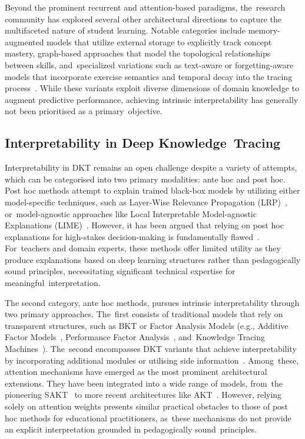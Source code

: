 \documentclass[applsci,article,accept,moreauthors,pdftex]{Definitions/mdpi}
\begin{document}
Beyond the prominent recurrent and attention-based paradigms, the~research community has explored several other architectural directions to capture the multifaceted nature of student learning. Notable categories include memory-augmented models that utilize external storage to explicitly track concept mastery, graph-based approaches that model the topological relationships between skills, and~specialized variations such as text-aware or forgetting-aware models that incorporate exercise semantics and temporal decay into the tracing process~\citep{abdelrahman2023knowledge}. While these variants exploit diverse dimensions of domain knowledge to augment predictive performance, achieving intrinsic interpretability has generally not been {prioritised} as a primary~objective.

\subsection{Interpretability in Deep Knowledge~Tracing} \label{sec_interpretability}

Interpretability in DKT remains an open challenge despite a variety of attempts, which can be categorised into two primary modalities: ante hoc and post hoc. Post hoc methods attempt to explain trained black-box models by utilizing either model-specific techniques, such as Layer-Wise Relevance Propagation (LRP)~\citep{bach2015pixel}, or~model-agnostic approaches like Local Interpretable Model-agnostic Explanations (LIME)~\citep{ribeiro2016should}. However, it has been argued that relying on post hoc explanations for high-stakes decision-making is fundamentally flawed~\citep{rudin2019stop}. For~teachers and domain experts, these methods offer limited utility as they produce explanations based on deep learning structures rather than pedagogically sound principles, necessitating significant technical expertise for meaningful~interpretation.

The second category, ante hoc methods, pursues intrinsic interpretability through two primary approaches. The~first consists of traditional models that rely on transparent structures, such as BKT or Factor Analysis Models (e.g., Additive Factor Models~\citep{cen2008comparing}, Performance Factor Analysis~\citep{pavlik2009performance}, and~Knowledge Tracing Machines~\citep{vie2019knowledge}). The~second encompasses DKT variants that achieve interpretability by incorporating additional modules or {utilising} side information~\citep{bai2024survey}. Among~these, attention mechanisms have emerged as the most prominent architectural extensions. They have been integrated into a wide range of models, from~the pioneering SAKT~\citep{Pandey2019384} to more recent architectures like AKT~\citep{ghosh2020context}. However, relying solely on attention weights presents similar practical obstacles to those of post hoc methods for educational practitioners, as~these mechanisms do not provide an explicit interpretation grounded in pedagogically sound~principles. 
\end{document}
